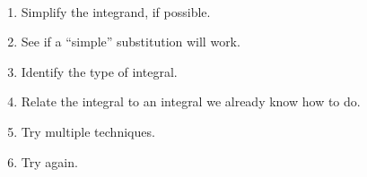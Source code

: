 \clearpage

\begin{keyidea}\label{ki_int_strat}%
\mbox{}\\[-2\baselineskip]\parbox[t]{\linewidth}{%
\begin{enumerate}
	\item Simplify the integrand, if possible.
	\item See if a ``simple'' substitution will work.
	\item Identify the type of integral.
	\item Relate the integral to an integral we already know how to do.
	\item Try multiple techniques.
	\item Try again.
\end{enumerate}}
\end{keyidea}


